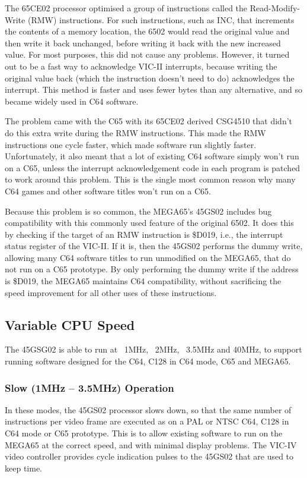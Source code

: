 The 65CE02 processor optimised a group of instructions called the Read-Modify-Write (RMW)
instructions.  For such instructions, such as INC, that increments the contents of a memory
location, the 6502 would read the original value and then write it back unchanged, before
writing it back with the new increased value.  For most purposes, this did not cause any
problems. However, it turned out to be a fast way to acknowledge VIC-II interrupts, because
writing the original value back (which the instruction doesn't need to do) acknowledges
the interrupt.  This method is faster and uses fewer bytes than any alternative, and so
became widely used in C64 software.

The problem came with the C65 with its 65CE02 derived CSG4510 that didn't do this extra write
during the RMW instructions.  This made the RMW instructions one cycle faster, which made
software run slightly faster. Unfortunately, it also meant that a lot of existing C64 software
simply won't run on a C65, unless the interrupt acknowledgement code in each program is patched
to work around this problem. This is the single most common reason why many C64 games and other
software titles won't run on a C65.

Because this problem is so common, the MEGA65's 45GS02 includes bug compatibility with this
commonly used feature of the original 6502.  It does this by checking if the target of an RMW
instruction is \$D019, i.e., the interrupt status register of the VIC-II.  If it is, then
the 45GS02 performs the dummy write, allowing many C64 software titles to run unmodified on the
MEGA65, that do not run on a C65 prototype.  By only performing the dummy write if the address
is \$D019, the MEGA65 maintains C64 compatibility, without sacrificing the speed improvement
for all other uses of these instructions.

\subsection{Variable CPU Speed}

The 45GSG02 is able to run at ~1MHz, ~2MHz, ~3.5MHz and 40MHz, to support running software
designed for the C64, C128 in C64 mode, C65 and MEGA65.

\subsubsection{Slow (1MHz -- 3.5MHz) Operation}
In these modes, the 45GS02 processor slows down, so that the same number of instructions
per video frame are executed as on a PAL or NTSC C64, C128 in C64 mode or C65 prototype.
This is to allow existing software to run on the MEGA65 at the correct speed, and with
minimal display problems.  The VIC-IV video controller provides cycle indication pulses
to the 45GS02 that are used to keep time.

